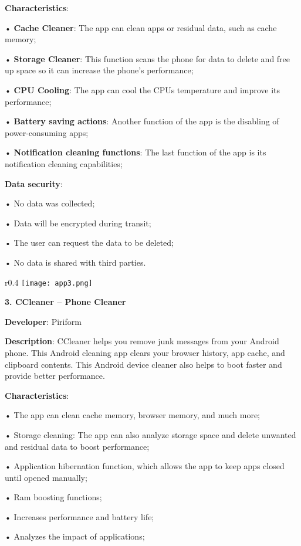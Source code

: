 \textbf{Characteristics}:

• \textbf{Cache Cleaner}: The app can clean apps or residual data, such as cache memory;

• \textbf{Storage Cleaner}: This function scans the phone for data to delete and free up space so it can increase the phone's performance;

• \textbf{CPU Cooling}: The app can cool the CPUs temperature and improve its performance;

• \textbf{Battery saving actions}: Another function of the app is the disabling of power-consuming apps;

• \textbf{Notification cleaning functions}: The last function of the app is its notification cleaning capabilities;

\textbf{Data security}:

• No data was collected;

• Data will be encrypted during transit;

• The user can request the data to be deleted;

• No data is shared with third parties.\newline

\begin{wrapfigure}{r}{0.4\textwidth} 
    \centering
    \texttt{[image: app3.png]}
\end{wrapfigure}

\noindent 
\textbf{3. CCleaner – Phone Cleaner }

\textbf{Developer}: Piriform

\textbf{Description}: CCleaner helps you remove junk messages from your Android phone. This Android cleaning app clears your browser history, app cache, and clipboard contents. This Android device cleaner also helps to boot faster and provide better performance.

\textbf{Characteristics}:

• The app can clean cache memory, browser memory, and much more;

• Storage cleaning: The app can also analyze storage space and delete unwanted and residual data to boost performance;

• Application hibernation function, which allows the app to keep apps closed until opened manually;

• Ram boosting functions;

• Increases performance and battery life;

• Analyzes the impact of applications;

